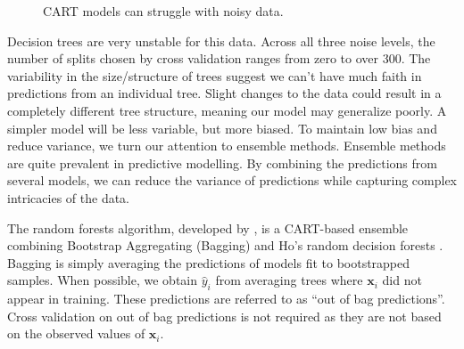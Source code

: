 \documentclass[
  12pt,
  letterpaper,
  DIV=11,
  numbers=noendperiod]{scrartcl}
\newcommand{\bm}{\mathbf}
\begin{document}
\begin{figure}[H]


\caption{\label{fig-sim1-tree}CART models can struggle with noisy data.}

\end{figure}%

Decision trees are very unstable for this data. Across all three noise
levels, the number of splits chosen by cross validation ranges from zero
to over 300. The variability in the size/structure of trees suggest we
can't have much faith in predictions from an individual tree. Slight
changes to the data could result in a completely different tree
structure, meaning our model may generalize poorly. A simpler model will
be less variable, but more biased. To maintain low bias and reduce
variance, we turn our attention to ensemble methods. Ensemble methods
are quite prevalent in predictive modelling. By combining the
predictions from several models, we can reduce the variance of
predictions while capturing complex intricacies of the data.

The random forests algorithm, developed by \cite{random_forest}, is a
CART-based ensemble combining Bootstrap Aggregating (Bagging)
\cite{bagging} and Ho's random decision forests \cite{Ho}. Bagging is
simply averaging the predictions of models fit to bootstrapped samples.
When possible, we obtain \(\hat y_i\) from averaging trees where
\(\bm x_i\) did not appear in training. These predictions are referred
to as ``out of bag predictions''. Cross validation on out of bag
predictions is not required as they are not based on the observed values
of \(\bm x_i\).
\end{document}
